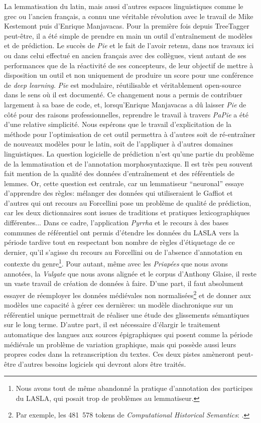 La lemmatisation du latin, mais aussi d'autres espaces linguistiques comme le grec ou l'ancien français, a connu une véritable révolution avec le travail de Mike Kestemont puis d'Enrique Manjavacas. Pour la première fois depuis TreeTagger peut-être, il a été simple de prendre en main un outil d'entraînement de modèles et de prédiction. Le succès de \textit{Pie} et le fait de l'avoir retenu, dans nos travaux ici ou dans celui effectué en ancien français avec des collègues, vient autant de ses performances que de la réactivité de ses concepteurs, de leur objectif de mettre à disposition un outil et non uniquement de produire un score pour une conférence de \textit{deep learning}. \textit{Pie} est modulaire, réutilisable et véritablement open-source dans le sens où il est documenté. Ce changement nous a permis de contribuer largement à sa base de code, et, lorsqu'Enrique Manjavacas a dû laisser \textit{Pie} de côté pour des raisons professionnelles, reprendre le travail à travers \textit{PaPie} a été d'une relative simplicité. Nous espérons que le travail d'explicitation de la méthode pour l'optimisation de cet outil permettra à d'autres soit de ré-entraîner de nouveaux modèles pour le latin, soit de l'appliquer à d'autres domaines linguistiques. La question logicielle de prédiction n'est qu'une partie du problème de la lemmatisation et de l'annotation morphosyntaxique. Il est très peu souvent fait mention de la qualité des données d'entraînement et des référentiels de lemmes. Or, cette question est centrale, car un lemmatiseur \enquote{neuronal} essaye d'apprendre des règles: mélanger des données qui utiliseraient le Gaffiot et d'autres qui ont recours au Forcellini pose un problème de qualité de prédiction, car les deux dictionnaires sont issues de traditions et pratiques lexicographiques différentes... Dans ce cadre, l'application \textit{Pyrrha} et le recours à des bases communes de référentiel ont permis d'étendre les données du LASLA vers la période tardive tout en respectant bon nombre de règles d'étiquetage de ce dernier, qu'il s'agisse du recours au Forcellini ou de l'absence d'annotation en contexte du genre\footnote{Nous avons tout de même abandonné la pratique d'annotation des participes du LASLA, qui posait trop de problèmes au lemmatiseur.}. Pour autant, même avec les \textit{Priapées} que nous avons annotées, la \textit{Vulgate} que nous avons alignée et le corpus d'Anthony Glaise, il reste un vaste travail de création de données à faire. D'une part, il faut absolument essayer de réemployer les données médiévales non normalisées\footnote{Par exemple, les 481~578 tokens de \textit{Computational Historical Semantics}: \textcite{capitularies}.} et de donner aux modèles une capacité à gérer ces dernières: un modèle diachronique sur un référentiel unique permettrait de réaliser une étude des glissements sémantiques sur le long terme. D'autre part, il est nécessaire d'élargir le traitement automatique des langues aux sources épigraphiques qui posent comme la période médiévale un problème de variation graphique, mais qui possède aussi leurs propres codes dans la retranscription du textes. Ces deux pistes amèneront peut-être d'autres besoins logiciels qui devront alors être traités.

